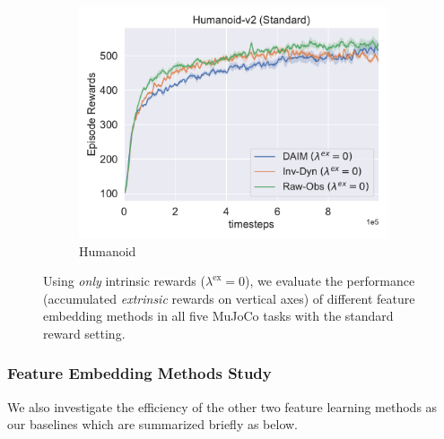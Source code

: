 \begin{figure}[h!]
\begin{subfigure}[t]{0.49\textwidth}
    \includegraphics[width=\textwidth]{figures/chapter5/r_in_only/humanoid.pdf}
    \caption{Humanoid}
  \end{subfigure}\hfill
  \caption[Results of using intrinsic reward only with different feature embedding methods in the MuJoCo environment with the standard reward setting.]{Using {\em only} intrinsic rewards ($\lambda^{\text{ex}}=0$), we evaluate the performance (accumulated {\it extrinsic} rewards on vertical axes) of different feature embedding methods in all five MuJoCo tasks with the standard reward setting.} 
  \label{fig:walker2d_results_r_in}
\end{figure}


\subsubsection{Feature Embedding Methods Study}
We also investigate the efficiency of the other two feature learning methods as our baselines which are summarized briefly as below.

